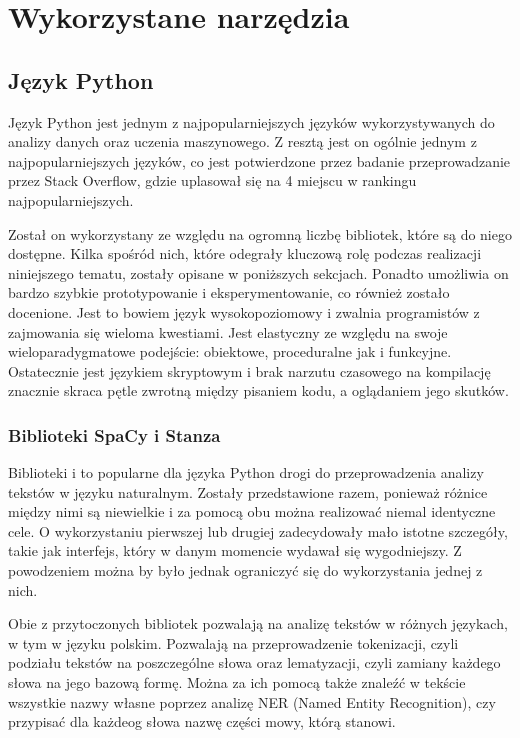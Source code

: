 \chapter{Wykorzystane narzędzia}

\section{Język Python}
Język Python jest jednym z najpopularniejszych języków wykorzystywanych do analizy danych oraz uczenia maszynowego. Z resztą jest on ogólnie jednym z najpopularniejszych języków, co jest potwierdzone przez badanie  \cite{stackoverflow-survey} przeprowadzanie przez Stack Overflow, gdzie uplasował się na 4 miejscu w rankingu najpopularniejszych.

Został on wykorzystany ze względu na ogromną liczbę bibliotek, które są do niego dostępne. Kilka spośród nich, które odegrały kluczową rolę podczas realizacji niniejszego tematu, zostały opisane w poniższych sekcjach. Ponadto umożliwia on bardzo szybkie prototypowanie i eksperymentowanie, co również zostało docenione. Jest to bowiem język wysokopoziomowy i zwalnia programistów z zajmowania się wieloma kwestiami. Jest elastyczny ze względu na swoje wieloparadygmatowe podejście: obiektowe, proceduralne jak i funkcyjne. Ostatecznie jest językiem skryptowym i brak narzutu czasowego na kompilację znacznie skraca pętle zwrotną między pisaniem kodu, a oglądaniem jego skutków.

\subsection{Biblioteki SpaCy i Stanza}
Biblioteki  i  to popularne dla języka Python drogi do przeprowadzenia analizy tekstów w języku naturalnym. Zostały przedstawione razem, ponieważ różnice między nimi są niewielkie i za pomocą obu można realizować niemal identyczne cele. O wykorzystaniu pierwszej lub drugiej zadecydowały mało istotne szczegóły, takie jak interfejs, który w danym momencie wydawał się wygodniejszy. Z powodzeniem można by było jednak ograniczyć się do wykorzystania jednej z nich.

Obie z przytoczonych bibliotek pozwalają na analizę tekstów w różnych językach, w tym w języku polskim. Pozwalają na przeprowadzenie tokenizacji, czyli podziału tekstów na poszczególne słowa oraz lematyzacji, czyli zamiany każdego słowa na jego bazową formę. Można za ich pomocą także znaleźć w tekście wszystkie nazwy własne poprzez analizę NER (Named Entity Recognition), czy przypisać dla każdeog słowa nazwę części mowy, którą stanowi. 

